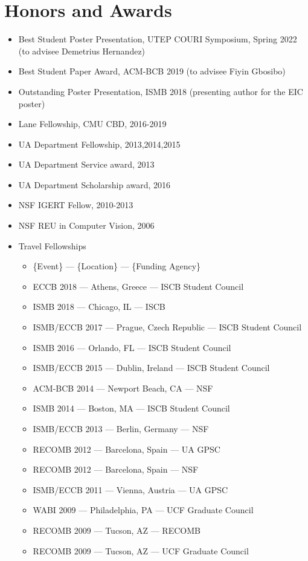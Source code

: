\documentclass[10pt,letterpaper]{article}
\begin{document}
\section*{Honors and Awards}

\begin{itemize}
    \item Best Student Poster Presentation, UTEP COURI Symposium, Spring 2022 (to advisee Demetrius Hernandez)
    \item Best Student Paper Award, ACM-BCB 2019 (to advisee Fiyin Gbosibo)
    \item Outstanding Poster Presentation, ISMB 2018 (presenting author for the EIC poster)
    \item Lane Fellowship, CMU CBD, 2016-2019
    \item UA Department Fellowship, 2013,2014,2015
    \item UA Department Service award, 2013
    \item UA Department Scholarship award, 2016
    \item NSF IGERT Fellow, 2010-2013
    \item NSF REU in Computer Vision, 2006
    \item Travel Fellowships
    \begin{itemize}
    	\item \{Event\} --- \{Location\} --- \{Funding Agency\}
    	\item ECCB 2018 --- Athens, Greece --- ISCB Student Council
    	\item ISMB 2018 --- Chicago, IL --- ISCB
	\item ISMB/ECCB 2017 --- Prague, Czech Republic --- ISCB Student Council 
	\item ISMB 2016 --- Orlando, FL --- ISCB Student Council
	\item ISMB/ECCB 2015 --- Dublin, Ireland --- ISCB Student Council
	\item ACM-BCB 2014 --- Newport Beach, CA --- NSF
	\item ISMB 2014 --- Boston, MA --- ISCB Student Council 
	\item ISMB/ECCB 2013 --- Berlin, Germany --- NSF
	\item RECOMB 2012 --- Barcelona, Spain --- UA GPSC
	\item RECOMB 2012 --- Barcelona, Spain --- NSF
	\item ISMB/ECCB 2011 --- Vienna, Austria --- UA GPSC
	\item WABI 2009 --- Philadelphia, PA --- UCF Graduate Council 
	\item RECOMB 2009 --- Tucson, AZ --- RECOMB
	\item RECOMB 2009 --- Tucson, AZ --- UCF Graduate Council
    \end{itemize}
\end{itemize}
\end{document}
